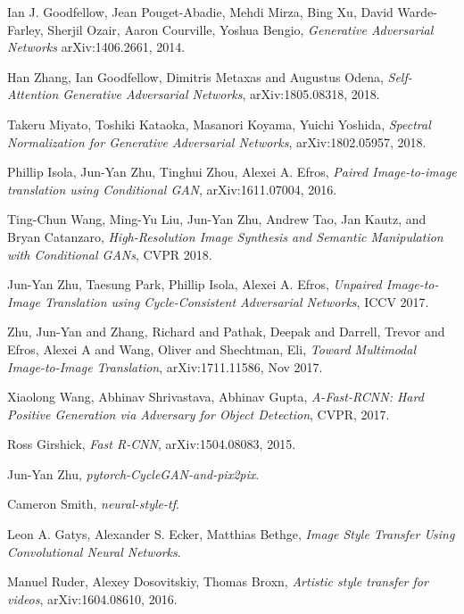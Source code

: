 \begin{thebibliography}{}

    Ian J. Goodfellow, Jean Pouget-Abadie, Mehdi Mirza, Bing Xu, David Warde-Farley, Sherjil Ozair, Aaron Courville, Yoshua Bengio,
    \emph{Generative Adversarial Networks}
    arXiv:1406.2661, 2014.

	Han Zhang, Ian Goodfellow, Dimitris Metaxas and Augustus Odena,
	\emph{Self-Attention Generative Adversarial Networks},
	arXiv:1805.08318, 2018.

	Takeru Miyato, Toshiki Kataoka, Masanori Koyama, Yuichi Yoshida,
	\emph{Spectral Normalization for Generative Adversarial Networks},
	arXiv:1802.05957, 2018.

	Phillip Isola, Jun-Yan Zhu, Tinghui Zhou, Alexei A. Efros,
	\emph{Paired Image-to-image translation using Conditional GAN},
	arXiv:1611.07004, 2016.

	Ting-Chun Wang, Ming-Yu Liu, Jun-Yan Zhu, Andrew Tao, Jan Kautz, and Bryan Catanzaro,
	\emph{High-Resolution Image Synthesis and Semantic Manipulation with Conditional GANs},
	CVPR 2018.

	Jun-Yan Zhu, Taesung Park, Phillip Isola, Alexei A. Efros,
	\emph{Unpaired Image-to-Image Translation using Cycle-Consistent Adversarial Networks},
	ICCV 2017.

	Zhu, Jun-Yan and Zhang, Richard and Pathak, Deepak and Darrell, Trevor and Efros, Alexei A and Wang, Oliver and Shechtman, Eli,
	\emph{Toward Multimodal Image-to-Image Translation},
	arXiv:1711.11586, Nov 2017.

	Xiaolong Wang, Abhinav Shrivastava, Abhinav Gupta,
	\emph{A-Fast-RCNN: Hard Positive Generation via Adversary for Object Detection},
    CVPR, 2017.

	Ross Girshick,
    \emph{Fast R-CNN},
    arXiv:1504.08083, 2015.

	Jun-Yan Zhu,
	\emph{pytorch-CycleGAN-and-pix2pix}.

	Cameron Smith,
	\emph{neural-style-tf}.

	Leon A. Gatys, Alexander S. Ecker, Matthias Bethge,
    \emph{Image Style Transfer Using Convolutional Neural Networks}.

	Manuel Ruder, Alexey Dosovitskiy, Thomas Broxn,
    \emph{Artistic style transfer for videos},
    arXiv:1604.08610, 2016.


\end{thebibliography}
